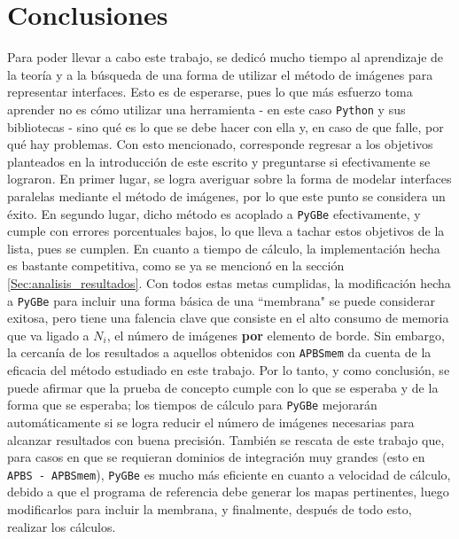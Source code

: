 \documentclass[12pt, twoside, onehalfspace, numbers, spanish]{ezthesis}
\numberwithin{equation}{section}
\begin{document}
\chapter{Conclusiones}
Para poder llevar a cabo este trabajo, se dedicó mucho tiempo al aprendizaje de la teoría y a la búsqueda de una forma de utilizar el método de imágenes para representar interfaces. Esto es de esperarse, pues lo que más esfuerzo toma aprender no es cómo utilizar una herramienta - en este caso \texttt{Python} y sus bibliotecas - sino qué es lo que se debe hacer con ella y, en caso de que falle, por qué hay problemas. Con esto mencionado, corresponde regresar a los objetivos planteados en la introducción de este escrito y preguntarse si efectivamente se lograron. En primer lugar, se logra averiguar sobre la forma de modelar interfaces paralelas mediante el método de imágenes, por lo que este punto se considera un éxito. En segundo lugar, dicho método es acoplado a \texttt{PyGBe} efectivamente, y cumple con errores porcentuales bajos, lo que lleva a tachar estos objetivos de la lista, pues se cumplen. En cuanto a tiempo de cálculo, la implementación hecha es bastante competitiva, como se ya se mencionó en la sección \ref{Sec:analisis_resultados}. Con todos estas metas cumplidas, la modificación hecha a \texttt{PyGBe} para incluir una forma básica de una ``membrana" se puede considerar exitosa, pero tiene una falencia clave que consiste en el alto consumo de memoria que va ligado a $N_i$, el número de imágenes \textbf{por} elemento de borde. Sin embargo, la cercanía de los resultados a aquellos obtenidos con \texttt{APBSmem} da cuenta de la eficacia del método estudiado en este trabajo. Por lo tanto, y como conclusión, se puede afirmar que la prueba de concepto cumple con lo que se esperaba y de la forma que se esperaba; los tiempos de cálculo para \texttt{PyGBe} mejorarán automáticamente si se logra reducir el número de imágenes necesarias para alcanzar resultados con buena precisión. También se rescata de este trabajo que, para casos en que se requieran dominios de integración muy grandes (esto en \texttt{APBS - APBSmem}), \texttt{PyGBe} es mucho más eficiente en cuanto a velocidad de cálculo, debido a que el programa de referencia debe generar los mapas pertinentes, luego modificarlos para incluir la membrana, y finalmente, después de todo esto, realizar los cálculos.
\end{document}
